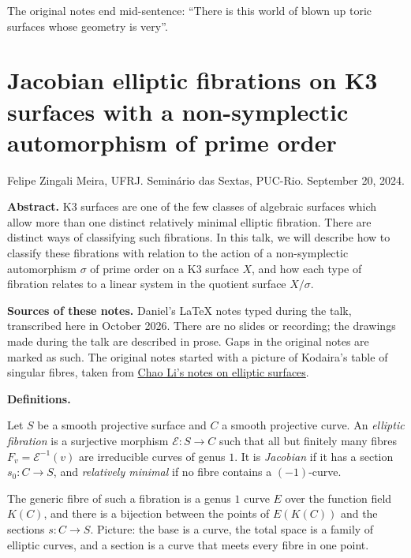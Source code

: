 The original notes end mid-sentence: ``There
is this world of blown up toric surfaces
whose geometry is very''.



\section{Jacobian elliptic fibrations on K3
surfaces with a non-symplectic automorphism
of prime order}
\label{section-zingali-elliptic-k3}

\noindent
Felipe Zingali Meira, UFRJ.
Seminário das Sextas, PUC-Rio.
September 20, 2024.

\medskip\noindent
{\bf Abstract.} K3 surfaces are one of the
few classes of algebraic surfaces which
allow more than one distinct relatively
minimal elliptic fibration. There are
distinct ways of classifying such
fibrations. In this talk, we will describe
how to classify these fibrations with
relation to the action of a non-symplectic
automorphism $\sigma$ of prime order on a
K3 surface $X$, and how each type of
fibration relates to a linear system in the
quotient surface $X/\sigma$.

\medskip\noindent
{\bf Sources of these notes.} Daniel's
LaTeX notes typed during the talk,
transcribed here in October 2026. There are
no slides or recording; the drawings made
during the talk are described in prose.
Gaps in the original notes are marked as
such. The original notes started with a
picture of Kodaira's table of singular
fibres, taken from
\href{https://www.math.columbia.edu/~chaoli/docs/EllipticSurfaces.html}{Chao
Li's notes on elliptic surfaces}.

\medskip\noindent
{\bf Definitions.}

\begin{definition}
\label{definition-zingali-elliptic-fibration}
Let $S$ be a smooth projective surface and
$C$ a smooth projective curve. An
\emph{elliptic fibration} is a surjective
morphism $\mathcal{E}\colon S\to C$ such
that all but finitely many fibres
$F_v=\mathcal{E}^{-1}(v)$ are irreducible
curves of genus $1$. It is \emph{Jacobian}
if it has a section $s_0\colon C\to S$, and
\emph{relatively minimal} if no fibre
contains a $(-1)$-curve.
\end{definition}

The generic fibre of such a fibration is a
genus $1$ curve $E$ over the function field
$K(C)$, and there is a bijection between the
points of $E(K(C))$ and the sections
$s\colon C\to S$. Picture: the base is a
curve, the total space is a family of
elliptic curves, and a section is a curve
that meets every fibre in one point.

